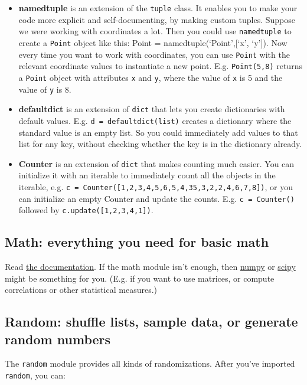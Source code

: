 \documentclass[12pt]{book}
\begin{document}
\begin{itemize}
\item \textbf{namedtuple} is an extension of the \texttt{tuple} class. It enables you to make your code more explicit and self-documenting, by making custom tuples. Suppose we were working with coordinates a lot. Then you could use \texttt{namedtuple} to create a \texttt{Point} object like this: Point = namedtuple(`Point',{[}`x', `y'{]}). Now every time you want to work with coordinates, you can use \texttt{Point} with the relevant coordinate values to instantiate a new point. E.g. \texttt{Point(5,8)} returns a \texttt{Point} object with attributes \texttt{x} and \texttt{y}, where the value of \texttt{x} is 5 and the value of \texttt{y} is 8.
\item \textbf{defaultdict} is an extension of \texttt{dict} that lets you create dictionaries with default values. E.g.
  \texttt{d\ =\ defaultdict(list)} creates a dictionary where the standard value is an empty list. So you could immediately add values to that list for any key, without checking whether the key is in the
  dictionary already.
\item \textbf{Counter} is an extension of \texttt{dict} that makes counting much easier. You can initialize it with an iterable to immediately count all the objects in the iterable, e.g. \texttt{c\ =\ Counter({[}1,2,3,4,5,6,5,4,35,3,2,2,4,6,7,8{]})}, or you can initialize an empty Counter and update the counts. E.g. \texttt{c\ =\ Counter()} followed by \texttt{c.update({[}1,2,3,4,1{]})}.
\end{itemize}

\subsection{Math: everything you need for basic math}

Read \href{https://docs.python.org/3/library/math.html}{the documentation}. If the math module isn't enough, then
\href{http://www.numpy.org/}{numpy} or \href{https://www.scipy.org/}{scipy} might be something for you. (E.g. if you want to use matrices, or compute correlations or other statistical measures.)

\subsection{Random: shuffle lists, sample data, or generate random numbers}

The \texttt{random} module provides all kinds of randomizations. After
you've imported \texttt{random}, you can:
\end{document}
